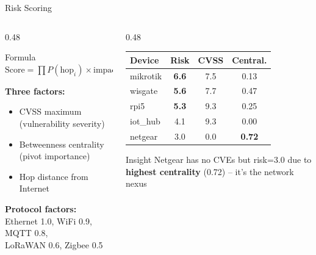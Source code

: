 \documentclass[aspectratio=169]{beamer}
\begin{document}
\begin{frame}{Risk Scoring}

\begin{columns}[T]
\begin{column}{0.48\textwidth}
\begin{block}{Formula}
$\text{Score} = \prod P(\text{hop}_i) \times \text{impact} \times \text{amplification}^{n-1}$
\end{block}

\vspace{0.2cm}
\textbf{Three factors:}
\begin{itemize}
    \item CVSS maximum (vulnerability severity)
    \item Betweenness centrality (pivot importance)
    \item Hop distance from Internet
\end{itemize}

\vspace{0.2cm}
\textbf{Protocol factors:}\\
Ethernet 1.0, WiFi 0.9, MQTT 0.8,\\
LoRaWAN 0.6, Zigbee 0.5
\end{column}

\begin{column}{0.48\textwidth}
\begin{table}
\centering
\small
\begin{tabular}{@{}lccc@{}}
\toprule
\textbf{Device} & \textbf{Risk} & \textbf{CVSS} & \textbf{Central.} \\
\midrule
mikrotik & \textbf{6.6} & 7.5 & 0.13 \\
wisgate & \textbf{5.6} & 7.7 & 0.47 \\
rpi5 & \textbf{5.3} & 9.3 & 0.25 \\
iot\_hub & 4.1 & 9.3 & 0.00 \\
netgear & 3.0 & 0.0 & \textbf{0.72} \\
\bottomrule
\end{tabular}
\end{table}

\begin{exampleblock}{Insight}
\small Netgear has no CVEs but risk=3.0 due to \textbf{highest centrality} (0.72) -- it's the network nexus
\end{exampleblock}
\end{column}
\end{columns}
\end{frame}
\end{document}
